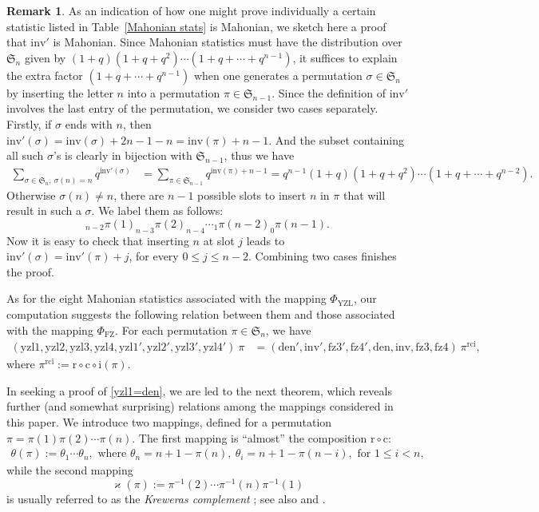 \documentclass[12pt]{amsart}
\numberwithin{equation}{section}
\theoremstyle{plain}
\theoremstyle{definition}
\newtheorem{remark}[theorem]{Remark}
\def\FZ{\mathrm{FZ}}
\def\YZL{\mathrm{YZL}}
\def\SS{\mathfrak{S}}
\def\cc{\mathrm{c}}
\def\r{\mathrm{r}}
\def\i{\mathrm{i}}
\def\rci{\mathrm{rci}}
\def\inv{\mathrm{inv}}
\def\den{\mathrm{den}}
\def\inv{\mathrm{inv}}
\def\fzthree{\mathrm{fz3}}
\def\fzfour{\mathrm{fz4}}
\def\yzlone{\mathrm{yzl1}}
\def\yzltwo{\mathrm{yzl2}}
\def\yzlthree{\mathrm{yzl3}}
\def\yzlfour{\mathrm{yzl4}}
\begin{document}
\begin{remark}
As an indication of how one might prove individually a certain statistic listed in Table~\ref{Mahonian stats} is Mahonian, we sketch here a proof that $\inv'$ is Mahonian. Since Mahonian statistics must have the distribution over $\SS_n$ given by $(1+q)(1+q+q^2)\cdots(1+q+\cdots+q^{n-1})$, it suffices to explain the extra factor $(1+q+\cdots+q^{n-1})$ when one generates a permutation $\sigma\in\SS_n$ by inserting the letter $n$ into a permutation $\pi\in\SS_{n-1}$. Since the definition of $\inv'$ involves the last entry of the permutation, we consider two cases separately. Firstly, if $\sigma$ ends with $n$, then $\inv'(\sigma)=\inv(\sigma)+2n-1-n=\inv(\pi)+n-1$. And the subset containing all such $\sigma$'s is clearly in bijection with $\SS_{n-1}$, thus we have
\begin{align*}
\sum_{\sigma\in\SS_n,~\sigma(n)=n}q^{\inv'(\sigma)}&=\sum_{\pi\in\SS_{n-1}}q^{\inv(\pi)+n-1}=q^{n-1}(1+q)(1+q+q^2)\cdots(1+q+\cdots+q^{n-2}).
\end{align*}
Otherwise $\sigma(n)\neq n$, there are $n-1$ possible slots to insert $n$ in $\pi$ that will result in such a $\sigma$. We label them as follows:
$${}_{n-2}\pi(1)_{n-3}\pi(2)_{n-4}\cdots_{1}\pi(n-2)_0\pi(n-1).$$
Now it is easy to check that inserting $n$ at slot $j$ leads to $\inv'(\sigma)=\inv'(\pi)+j$, for every $0\le j\le n-2$. Combining two cases finishes the proof.
\end{remark}

As for the eight Mahonian statistics associated with the mapping $\Phi_{\YZL}$, our computation suggests the following relation between them and those associated with the mapping $\Phi_{\FZ}$. For each permutation $\pi\in\SS_n$, we have
\begin{align}
\label{yzl1=den}
(\yzlone,\yzltwo,\yzlthree,\yzlfour,\yzlone',\yzltwo',\yzlthree',\yzlfour')\:\pi &= (\den',\inv',\fzthree',\fzfour',\den,\inv,\fzthree,\fzfour)\:\pi^{\rci},
\end{align}
where $\pi^{\rci}:=\r\circ\cc\circ\i(\pi)$.

In seeking a proof of \eqref{yzl1=den}, we are led to the next theorem, which reveals further (and somewhat surprising) relations among the mappings considered in this paper. We introduce two mappings, defined for a permutation $\pi=\pi(1)\pi(2)\cdots\pi(n)$. The first mapping is ``almost'' the composition $\r\circ\cc$:
\begin{align*}
\theta(\pi):=\theta_1\cdots\theta_n,\text{ where } \theta_n=n+1-\pi(n),~\theta_i=n+1-\pi(n-i),\text{ for } 1\le i<n,
\end{align*}
while the second mapping
$$\varkappa(\pi):= \pi^{-1}(2)\cdots\pi^{-1}(n)\pi^{-1}(1)$$
is usually referred to as the {\it Kreweras complement} \cite{Kre}; see also \cite[Chap.~4.2]{Arm} and \cite{SU}.
\end{document}
